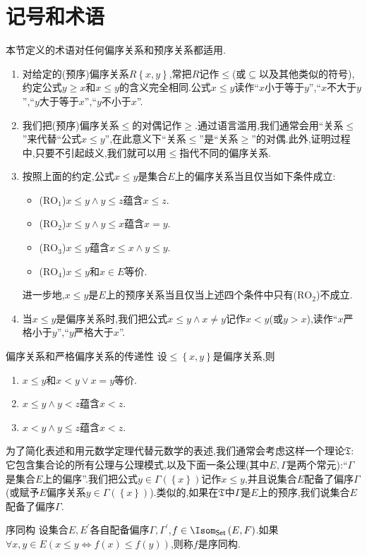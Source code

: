 \section{记号和术语}

本节定义的术语对任何偏序关系和预序关系都适用.

\begin{enumerate}
	\item 对给定的(预序)偏序关系$R\left\{x,y\right\}$,常把$R$记作$\leq$(或$\subseteq$以及其他类似的符号),约定公式$y\geq x$和$x\leq y$的含义完全相同.公式$x\leq y$读作``$x$小于等于$y$'',``$x$不大于$y$'',``$y$大于等于$x$'',``$y$不小于$x$''.
	\item 我们把(预序)偏序关系$\leq$的对偶记作$\geq$.通过语言滥用,我们通常会用``关系$\leq$''来代替``公式$x\leq y$'',在此意义下``关系$\leq$''是``关系$\geq$''的对偶.此外,证明过程中,只要不引起歧义,我们就可以用$\leq$指代不同的偏序关系.
	\item 按照上面的约定,公式$x\leq y$是集合$E$上的偏序关系当且仅当如下条件成立:
	\begin{itemize}
		\item ($\mathrm{RO}_{1}$)$x\leq y\wedge y\leq z$蕴含$x\leq z$.
		\item ($\mathrm{RO}_{2}$)$x\leq y\wedge y\leq x$蕴含$x=y$.
		\item ($\mathrm{RO}_{3}$)$x\leq y$蕴含$x\leq x\wedge y\leq y$.
		\item ($\mathrm{RO}_{4}$)$x\leq y$和$x\in E$等价.
	\end{itemize}
	进一步地,$x\leq y$是$E$上的预序关系当且仅当上述四个条件中只有($\mathrm{RO}_{2}$)不成立.
	\item 当$x\leq y$是偏序关系时,我们把公式$x\leq y\wedge x\neq y$记作$x<y$(或$y>x$),读作``$x$严格小于$y$'',``$y$严格大于$x$''.
\end{enumerate}

\begin{metatheorem}{偏序关系和严格偏序关系的传递性}{}
	设$\leq\left\{x,y\right\}$是偏序关系,则
	\begin{enumerate}
		\item $x\leq y$和$x<y\vee x=y$等价.
		\item $x\leq y\wedge y<z$蕴含$x<z$.
		\item $x<y\wedge y\leq z$蕴含$x<z$.
	\end{enumerate}
\end{metatheorem}

为了简化表述和用元数学定理代替元数学的表述,我们通常会考虑这样一个理论$\mathfrak{T}$:它包含集合论的所有公理与公理模式,以及下面一条公理(其中$E,\Gamma$是两个常元):``$\Gamma$是集合$E$上的偏序''.我们把公式$y\in\Gamma\left(\left\{x\right\}\right)$记作$x\leq y$,并且说集合$E$配备了偏序$\Gamma$(或赋予$E$偏序关系$y\in\Gamma\left(\left\{x\right\}\right)$).类似的,如果在$\mathfrak{T}$中$\Gamma$是$E$上的预序,我们说集合$E$配备了偏序$\Gamma$.

\begin{definition}{序同构}{}
	设集合$E,E^{\prime}$各自配备偏序$\Gamma,\Gamma^{\prime}$,$f\in\Isom_{\mathsf{Set}}\left(E,F\right)$.如果$\forall x,y\in E\left(x\leq y\iff f\left(x\right)\leq f\left(y\right)\right)$,则称$f$是序同构.
\end{definition}
















